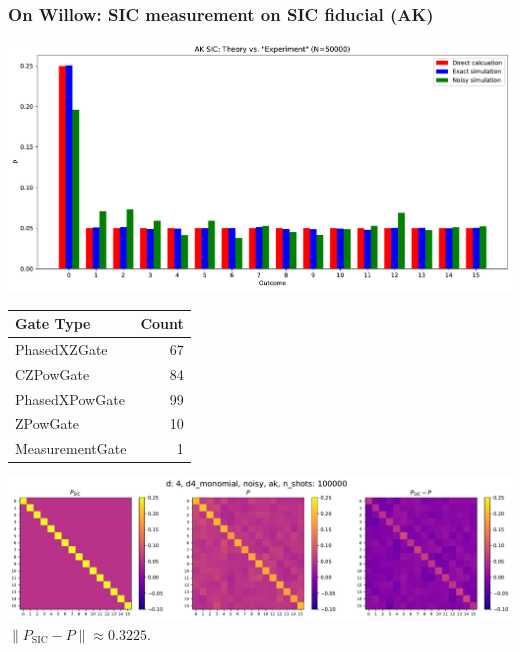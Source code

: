 \documentclass{beamer}
\begin{document}
\begin{frame}
\frametitle{On Willow: SIC measurement on SIC fiducial (AK)}
\begin{center}
\includegraphics[scale=0.34]{img/ak_theory_vs_experiment}	
\end{center}

\begin{tiny}
\begin{table}[h!]
\centering
\begin{tabular}{lr}
\toprule
\textbf{Gate Type} & \textbf{Count} \\
\midrule
PhasedXZGate    & 67 \\
CZPowGate       & 84 \\
PhasedXPowGate  & 99 \\
ZPowGate        & 10 \\
MeasurementGate & 1 \\
\bottomrule
\end{tabular}
\label{tab:circuit_gate_counts}
\end{table}
\end{tiny}
\end{frame}

\begin{frame}
\begin{center}
\includegraphics[scale=0.3]{img/P_d4_d4_monomial_noisy_ak_n100000}	
$\lVert P_{\text{SIC}}-P\rVert \approx 0.3225$.
\end{center}	
\end{frame}
\end{document}
